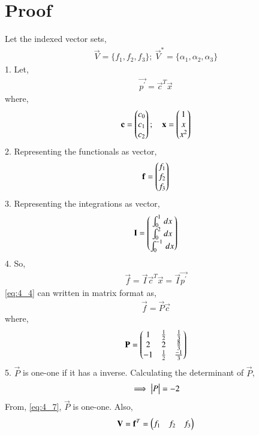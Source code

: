 \documentclass[journal,12pt,twocolumn]{IEEEtran}
\begin{document}
\section{Proof}
Let the indexed vector sets,
\begin{align}
    \vec{V} = \{f_1, f_2, f_3\}; \: \vec{V}^* = \{\alpha_1, \alpha_2, \alpha_3\} \nonumber 
\end{align}
1. Let,
\begin{align}
    \vec{p^\prime} = \vec{c}^T\vec{x} \label{eq:4_1}
\end{align}
where,
\begin{align}
    \mathbf{c} = \begin{pmatrix}c_0 \\ c_1 \\ c_2\end{pmatrix}; \quad 
    \mathbf{x} = \begin{pmatrix}1 \\ x \\ x^2\end{pmatrix} \nonumber
\end{align}
2. Representing the functionals as vector,
\begin{align}
    \mathbf{f} = \begin{pmatrix}f_1 \\ f_2 \\ f_3\end{pmatrix} \label{eq:4_2}
\end{align}
3. Representing the integrations as vector,
\begin{align}
    \mathbf{I} = \begin{pmatrix}\int_{0}^{1} \, dx \\ \int_{0}^{2} \, dx \\
    \int_{0}^{-1} \, dx\end{pmatrix} \label{eq:4_3}
\end{align}
4. So,
\begin{align}
    \vec{f} = \vec{I} \vec{c}^T \vec{x} = \vec{I} \vec{p^\prime} \label{eq:4_4}
\end{align}
\eqref{eq:4_4} can written in matrix format as,
\begin{align}
    \vec{f} = \vec{P} \vec{c} \label{eq:4_5}
\end{align}
where,
\begin{align}
    \mathbf{P}  = \begin{pmatrix}1 & \frac{1}{2} & \frac{1}{3} \\ 2 & 2 & \frac{8}{3} \\ -1 & \frac{1}{2} & \frac{-1}{3}\end{pmatrix} \label{eq:4_6}
\end{align}
5. $\vec{P}$ is one-one if it has a inverse. Calculating the determinant of $\vec{P}$,
\begin{align}
    \implies \begin{vmatrix}P\end{vmatrix} = -2 \label{eq:4_7}
\end{align}
From, \eqref{eq:4_7}, $\vec{P}$ is one-one. Also,
\begin{align}
    \mathbf{V} = \mathbf{f}^T = \begin{pmatrix}f_1 & f_2 & f_3\end{pmatrix} \label{eq:4_8} 
\end{align}
\end{document}
